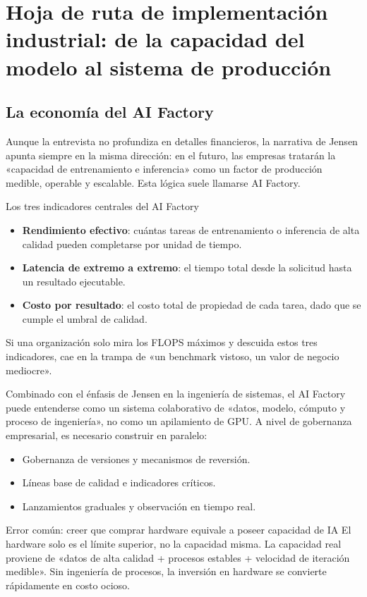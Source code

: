 \section{Hoja de ruta de implementación industrial: de la capacidad del modelo al sistema de producción}

\subsection{La economía del AI Factory}

Aunque la entrevista no profundiza en detalles financieros, la narrativa de Jensen apunta siempre en la misma dirección: en el futuro, las empresas tratarán la «capacidad de entrenamiento e inferencia» como un factor de producción medible, operable y escalable. Esta lógica suele llamarse AI Factory.

\begin{knowledgebox}{Los tres indicadores centrales del AI Factory}
\begin{itemize}
    \item \textbf{Rendimiento efectivo}: cuántas tareas de entrenamiento o inferencia de alta calidad pueden completarse por unidad de tiempo.
    \item \textbf{Latencia de extremo a extremo}: el tiempo total desde la solicitud hasta un resultado ejecutable.
    \item \textbf{Costo por resultado}: el costo total de propiedad de cada tarea, dado que se cumple el umbral de calidad.
\end{itemize}
Si una organización solo mira los FLOPS máximos y descuida estos tres indicadores, cae en la trampa de «un benchmark vistoso, un valor de negocio mediocre».
\end{knowledgebox}

Combinado con el énfasis de Jensen en la ingeniería de sistemas, el AI Factory puede entenderse como un sistema colaborativo de «datos, modelo, cómputo y proceso de ingeniería», no como un apilamiento de GPU. A nivel de gobernanza empresarial, es necesario construir en paralelo:
\begin{itemize}
    \item Gobernanza de versiones y mecanismos de reversión.
    \item Líneas base de calidad e indicadores críticos.
    \item Lanzamientos graduales y observación en tiempo real.
\end{itemize}

\begin{warningbox}{Error común: creer que comprar hardware equivale a poseer capacidad de IA}
El hardware solo es el límite superior, no la capacidad misma. La capacidad real proviene de «datos de alta calidad + procesos estables + velocidad de iteración medible». Sin ingeniería de procesos, la inversión en hardware se convierte rápidamente en costo ocioso.
\end{warningbox}

